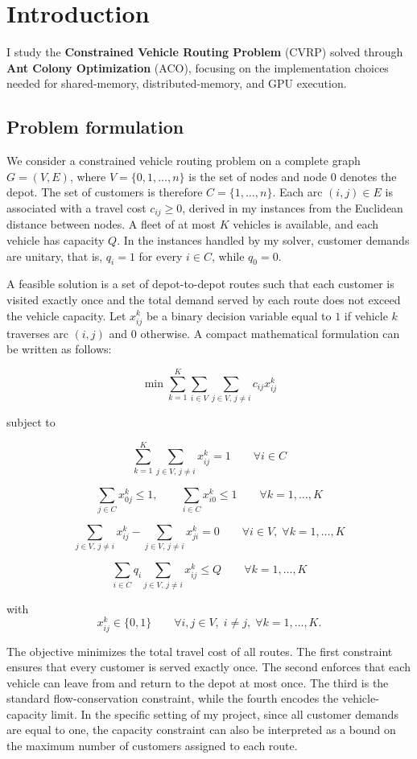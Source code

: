 \section{Introduction}

I study the \textbf{Constrained Vehicle Routing Problem} (CVRP) solved through \textbf{Ant Colony Optimization} (ACO), focusing on the implementation choices needed for shared-memory, distributed-memory, and GPU execution.

\subsection{Problem formulation}

We consider a constrained vehicle routing problem on a complete graph $G=(V,E)$, where $V=\{0,1,\dots,n\}$ is the set of nodes and node $0$ denotes the depot. The set of customers is therefore $C=\{1,\dots,n\}$. Each arc $(i,j) \in E$ is associated with a travel cost $c_{ij} \ge 0$, derived in my instances from the Euclidean distance between nodes. A fleet of at most $K$ vehicles is available, and each vehicle has capacity $Q$. In the instances handled by my solver, customer demands are unitary, that is, $q_i=1$ for every $i \in C$, while $q_0=0$.

A feasible solution is a set of depot-to-depot routes such that each customer is visited exactly once and the total demand served by each route does not exceed the vehicle capacity. Let $x_{ij}^k$ be a binary decision variable equal to $1$ if vehicle $k$ traverses arc $(i,j)$ and $0$ otherwise. A compact mathematical formulation can be written as follows:

\[
\min \sum_{k=1}^{K} \sum_{i \in V} \sum_{j \in V,\, j \ne i} c_{ij} x_{ij}^k
\]

subject to

\[
\sum_{k=1}^{K} \sum_{j \in V,\, j \ne i} x_{ij}^k = 1
\qquad \forall i \in C
\]

\[
\sum_{j \in C} x_{0j}^k \le 1,
\qquad
\sum_{i \in C} x_{i0}^k \le 1
\qquad \forall k=1,\dots,K
\]

\[
\sum_{j \in V,\, j \ne i} x_{ij}^k - \sum_{j \in V,\, j \ne i} x_{ji}^k = 0
\qquad \forall i \in V,\; \forall k=1,\dots,K
\]

\[
\sum_{i \in C} q_i \sum_{j \in V,\, j \ne i} x_{ij}^k \le Q
\qquad \forall k=1,\dots,K
\]

with
\[
x_{ij}^k \in \{0,1\}
\qquad \forall i,j \in V,\; i \ne j,\; \forall k=1,\dots,K.
\]

The objective minimizes the total travel cost of all routes. The first constraint ensures that every customer is served exactly once. The second enforces that each vehicle can leave from and return to the depot at most once. The third is the standard flow-conservation constraint, while the fourth encodes the vehicle-capacity limit. In the specific setting of my project, since all customer demands are equal to one, the capacity constraint can also be interpreted as a bound on the maximum number of customers assigned to each route.

